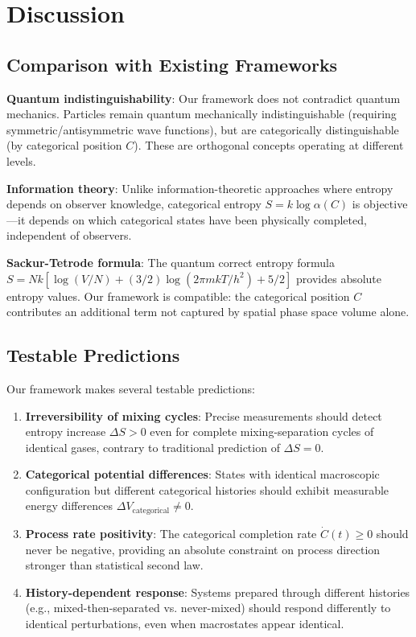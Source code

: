 \documentclass[12pt,a4paper]{article}
\theoremstyle{remark}
\begin{document}
\section{Discussion}

\subsection{Comparison with Existing Frameworks}

\textbf{Quantum indistinguishability}: Our framework does not contradict quantum mechanics. Particles remain quantum mechanically indistinguishable (requiring symmetric/antisymmetric wave functions), but are categorically distinguishable (by categorical position $C$). These are orthogonal concepts operating at different levels.

\textbf{Information theory}: Unlike information-theoretic approaches where entropy depends on observer knowledge, categorical entropy $S = k \log \alpha(C)$ is objective—it depends on which categorical states have been physically completed, independent of observers.

\textbf{Sackur-Tetrode formula}: The quantum correct entropy formula $S = Nk[\log(V/N) + (3/2)\log(2\pi mkT/h^2) + 5/2]$ provides absolute entropy values. Our framework is compatible: the categorical position $C$ contributes an additional term not captured by spatial phase space volume alone.

\subsection{Testable Predictions}

Our framework makes several testable predictions:

\begin{enumerate}
\item \textbf{Irreversibility of mixing cycles}: Precise measurements should detect entropy increase $\Delta S > 0$ even for complete mixing-separation cycles of identical gases, contrary to traditional prediction of $\Delta S = 0$.

\item \textbf{Categorical potential differences}: States with identical macroscopic configuration but different categorical histories should exhibit measurable energy differences $\Delta V_\text{categorical} \neq 0$.

\item \textbf{Process rate positivity}: The categorical completion rate $\dot{C}(t) \geq 0$ should never be negative, providing an absolute constraint on process direction stronger than statistical second law.

\item \textbf{History-dependent response}: Systems prepared through different histories (e.g., mixed-then-separated vs. never-mixed) should respond differently to identical perturbations, even when macrostates appear identical.
\end{enumerate}
\end{document}
